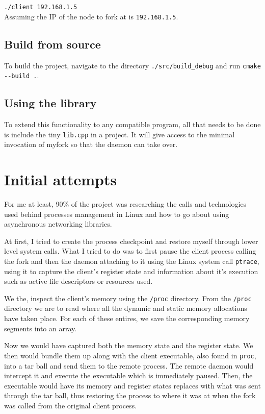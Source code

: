 \documentclass{article}
\begin{document}
\noindent \verb|./client 192.168.1.5|\\

Assuming the IP of the node to fork at is \verb|192.168.1.5|.

\subsection{Build from source}
To build the project, navigate to the directory \verb|./src/build_debug| and run \verb|cmake --build .|.

\subsection{Using the library}
To extend this functionality to any compatible program, all that needs to be done is include the tiny \verb|lib.cpp| in a project. It will give access to the minimal invocation of myfork so that the daemon can take over.

\section{Initial attempts}

For me at least, 90\% of the project was researching the calls and technologies used behind processes management in Linux and how to go about using asynchronous networking libraries.

At first, I tried to create the process checkpoint and restore myself through lower level system calls.
What I tried to do was to first pause the client process calling the fork and then the daemon attaching to it using the Linux system call \verb|ptrace|, using it to capture the client's register state and information about it's execution such as active file descriptors or resources used.

We the, inspect the client's memory using the \verb|/proc| directory.
From the \verb|/proc| directory we are to read where all the dynamic and static memory allocations have taken place.
For each of these entires, we save the corresponding memory segments into an array.

Now we would have captured both the memory state and the register state.
We then would bundle them up along with the client executable, also found in \verb|proc|, into a tar ball and send them to the remote process.
The remote daemon would intercept it and execute the executable which is immediately paused. Then, the executable would have its memory and register states replaces with what was sent through the tar ball, thus restoring the process to where it was at when the fork was called from the original client process.
\end{document}
